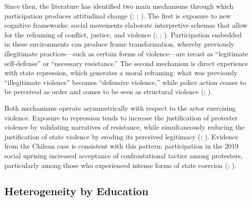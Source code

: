\documentclass[
  13pt,
]{article}
\begin{document}
Since then, the literature has identified two main mechanisms through
which participation produces attitudinal change
(;
;
). The first is
exposure to new cognitive frameworks: social movements elaborate
interpretive schemas that allow for the reframing of conflict, justice,
and violence (;
;
). Participation embedded in
these environments can produce frame transformation, whereby previously
illegitimate practices---such as certain forms of violence---are recast
as ``legitimate self-defense'' or ``necessary resistance.'' The second
mechanism is direct experience with state repression, which generates a
moral reframing: what was previously ``illegitimate violence'' becomes
``defensive violence,'' while police action ceases to be perceived as
order and comes to be seen as structural violence
(;
).

Both mechanisms operate asymmetrically with respect to the actor
exercising violence. Exposure to repression tends to increase the
justification of protester violence by validating narratives of
resistance, while simultaneously reducing the justification of state
violence by eroding its perceived legitimacy
(; ). Evidence
from the Chilean case is consistent with this pattern: participation in
the 2019 social uprising increased acceptance of confrontational tactics
among protesters, particularly among those who experienced intense forms
of state coercion (; ).

\subsection{Heterogeneity by
Education}\label{heterogeneity-by-education}
\end{document}
